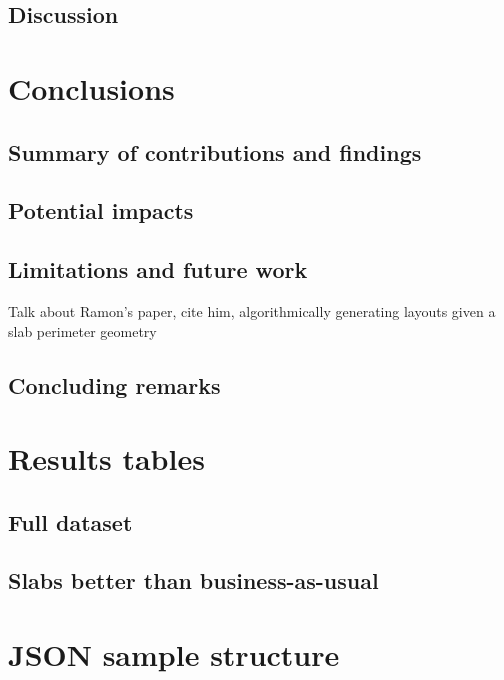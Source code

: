 \documentclass[10pt, letterpaper]{article} %
\begin{document}
    \subsection{Discussion}

    \section{Conclusions}

    \subsection{Summary of contributions and findings}

    \subsection{Potential impacts}

    \subsection{Limitations and future work}

    Talk about Ramon's paper, cite him, algorithmically generating layouts given a slab perimeter geometry

    \subsection{Concluding remarks}

    \begin{appendices}
        \section{Results tables}
        \subsection{Full dataset}
        \subsection{Slabs better than business-as-usual}
        \section{JSON sample structure}
    \end{appendices}

    \printbibliography
\end{document}
